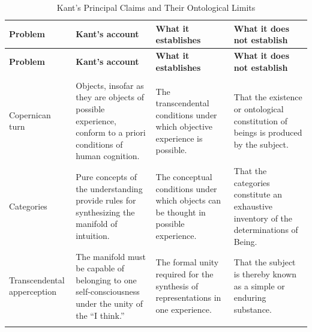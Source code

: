 \begin{center}
\small
\renewcommand{\arraystretch}{1.18}
\setlength{\tabcolsep}{4pt}

\begin{longtable}{
    >{\raggedright\arraybackslash}p{2.3cm}
    >{\raggedright\arraybackslash}p{}
    >{\raggedright\arraybackslash}p{}
    >{\raggedright\arraybackslash}p{}
}

\caption{Kant's Principal Claims and Their Ontological Limits}
\label{tab:VS.B01.P01.C08.S10.SS14.P003.TL01} \\

\toprule
\textbf{Problem}
&
\textbf{Kant's account}
&
\textbf{What it establishes}
&
\textbf{What it does not establish}
\\
\midrule
\endfirsthead

\toprule
\textbf{Problem}
&
\textbf{Kant's account}
&
\textbf{What it establishes}
&
\textbf{What it does not establish}
\\
\midrule
\endhead

\midrule
\multicolumn{4}{r}{\footnotesize\textit{Continued on next page}}\\
\endfoot

\bottomrule
\endlastfoot

Copernican turn
&
Objects, insofar as they are objects of possible
experience, conform to a priori conditions of
human cognition.
&
The transcendental conditions under which
objective experience is possible.
&
That the existence or ontological constitution
of beings is produced by the subject.
\\

\addlinespace

Categories
&
Pure concepts of the understanding provide
rules for synthesizing the manifold of intuition.
&
The conceptual conditions under which objects
can be thought in possible experience.
&
That the categories constitute an exhaustive
inventory of the determinations of Being.
\\

\addlinespace

Transcendental apperception
&
The manifold must be capable of belonging
to one self-consciousness under the unity
of the ``I think.''
&
The formal unity required for the synthesis
of representations in one experience.
&
That the subject is thereby known as a
simple or enduring substance.
\\

\addlinespace


\end{longtable}
\end{center}
